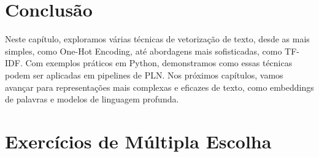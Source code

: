 \documentclass[14pt,a4paper,oneside]{book}
\begin{document}
\section{Conclusão}
Neste capítulo, exploramos várias técnicas de vetorização de texto, desde as mais simples, como One-Hot Encoding, até abordagens mais sofisticadas, como TF-IDF. Com exemplos práticos em Python, demonstramos como essas técnicas podem ser aplicadas em pipelines de PLN. Nos próximos capítulos, vamos avançar para representações mais complexas e eficazes de texto, como embeddings de palavras e modelos de linguagem profunda.

\newpage

\section*{Exercícios de Múltipla Escolha}
\end{document}
